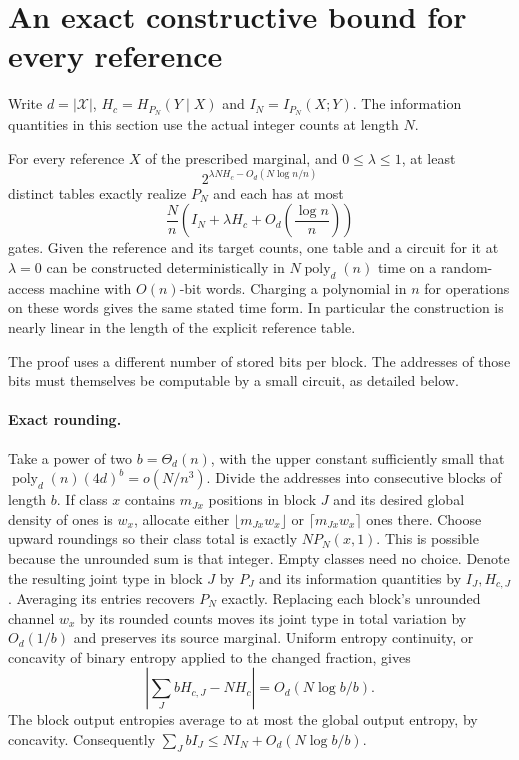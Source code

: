 \section{An exact constructive bound for every reference}
Write $d=|\mathcal X|$, $H_c=H_{P_N}(Y\mid X)$ and $I_N=I_{P_N}(X;Y)$. The information quantities in this section use the actual integer counts at length $N$.
\begin{theorem}\label{t:construct}
For every reference $X$ of the prescribed marginal, and $0\le\lambda\le1$, at least
\[
       2^{\lambda N H_c-O_d(N\log n/n)}
\]
distinct tables exactly realize $P_N$ and each has at most
\[
        \frac{N}{n}\left(I_N+\lambda H_c+
                      O_d\!\left(\frac{\log n}{n}\right)\right)
\]
gates. Given the reference and its target counts, one table and a circuit for it at $\lambda=0$ can be constructed deterministically in $N\operatorname{poly}_d(n)$ time on a random-access machine with $O(n)$-bit words. Charging a polynomial in $n$ for operations on these words gives the same stated time form. In particular the construction is nearly linear in the length of the explicit reference table.
\end{theorem}
The proof uses a different number of stored bits per block. The addresses of those bits must themselves be computable by a small circuit, as detailed below.

\paragraph{Exact rounding.} Take a power of two $b=\Theta_d(n)$, with the upper constant sufficiently small that $\operatorname{poly}_d(n)(4d)^b=o(N/n^3)$. Divide the addresses into consecutive blocks of length $b$. If class $x$ contains $m_{Jx}$ positions in block $J$ and its desired global density of ones is $w_x$, allocate either $\lfloor m_{Jx}w_x\rfloor$ or $\lceil m_{Jx}w_x\rceil$ ones there. Choose upward roundings so their class total is exactly $NP_N(x,1)$. This is possible because the unrounded sum is that integer. Empty classes need no choice. Denote the resulting joint type in block $J$ by $P_J$ and its information quantities by $I_J,H_{c,J}$. Averaging its entries recovers $P_N$ exactly. Replacing each block's unrounded channel $w_x$ by its rounded counts moves its joint type in total variation by $O_d(1/b)$ and preserves its source marginal. Uniform entropy continuity, or concavity of binary entropy applied to the changed fraction, gives
\[
 \left|\sum_J bH_{c,J}-NH_c\right|=O_d(N\log b/b).
\]
The block output entropies average to at most the global output entropy, by concavity. Consequently $\sum_J bI_J\le NI_N+O_d(N\log b/b)$.


